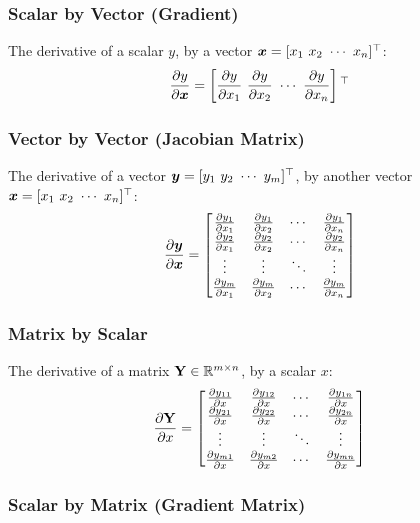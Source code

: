 \subsubsection*{Scalar by Vector (Gradient)}

The derivative of a scalar $y$, by a vector $\vec{x}=[x_1\ x_2\ \cdots\ x_n]\T$:
\begin{align*}
	\frac{\partial y}{\partial\boldsymbol{x}}=\left[\frac{\partial y}{\partial x_1}\ \frac{\partial y}{\partial x_2}\ \cdots\ \frac{\partial y}{\partial x_n}\right]{}^\top
\end{align*}

\subsubsection*{Vector by Vector (Jacobian Matrix)}

The derivative of a vector $\vec{y}=[y_1\ y_2\ \cdots\ y_m]\T$, by another vector $\vec{x}=[x_1\ x_2\ \cdots\ x_n]\T$:
\begin{align*}
	\frac{\partial\boldsymbol{y}}{\partial\boldsymbol{x}}=\begin{bmatrix}
		\frac{\partial y_1}{\partial x_1}&\frac{\partial y_1}{\partial x_2}&\cdots&\frac{\partial y_1}{\partial x_n} \\
		\frac{\partial y_2}{\partial x_1}&\frac{\partial y_2}{\partial x_2}&\cdots&\frac{\partial y_2}{\partial x_n} \\
		\vdots&\vdots&\ddots&\vdots \\
		\frac{\partial y_m}{\partial x_1}&\frac{\partial y_m}{\partial x_2}&\cdots&\frac{\partial y_m}{\partial x_n}
	\end{bmatrix}
\end{align*}

\subsubsection*{Matrix by Scalar}

The derivative of a matrix $\mathbf{Y}\in\mathbb{R}^{m\times n}$, by a scalar $x$:
\begin{align*}
	\frac{\partial\mathbf{Y}}{\partial x}=\begin{bmatrix}
	\frac{\partial y_{11}}{\partial x}&\frac{\partial y_{12}}{\partial x}&\cdots&\frac{\partial y_{1n}}{\partial x} \\
	\frac{\partial y_{21}}{\partial x}&\frac{\partial y_{22}}{\partial x}&\cdots&\frac{\partial y_{2n}}{\partial x} \\
	\vdots&\vdots&\ddots&\vdots \\
	\frac{\partial y_{m1}}{\partial x}&\frac{\partial y_{m2}}{\partial x}&\cdots&\frac{\partial y_{mn}}{\partial x}
\end{bmatrix}
\end{align*}

\subsubsection*{Scalar by Matrix (Gradient Matrix)}

